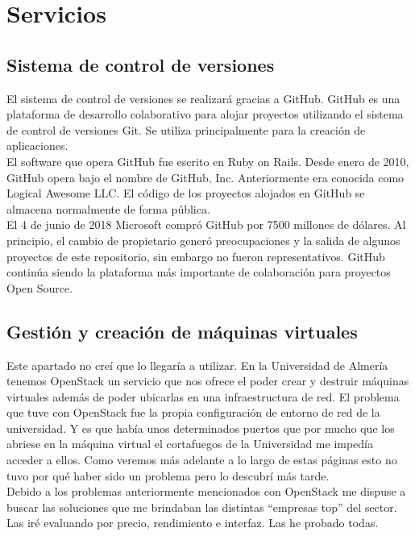 \section{Servicios}

\subsection{Sistema de control de versiones}
El sistema de control de versiones se realizará gracias a GitHub. GitHub es una plataforma de desarrollo colaborativo para alojar proyectos utilizando el sistema de control de versiones Git. Se utiliza principalmente para la creación de aplicaciones. 
\\El software que opera GitHub fue escrito en Ruby on Rails. Desde enero de 2010, GitHub opera bajo el nombre de GitHub, Inc. Anteriormente era conocida como Logical Awesome LLC. El código de los proyectos alojados en GitHub se almacena normalmente de forma pública.
\\El 4 de junio de 2018 Microsoft compró GitHub por 7500 millones de dólares. Al principio, el cambio de propietario generó preocupaciones y la salida de algunos proyectos de este repositorio, sin embargo no fueron representativos. GitHub continúa siendo la plataforma más importante de colaboración para proyectos Open Source.

\subsection{Gestión y creación de máquinas virtuales}

Este apartado no creí que lo llegaría a utilizar. En la Universidad de Almería tenemos OpenStack un servicio que nos ofrece el poder crear y destruir máquinas virtuales además de poder ubicarlas en una infraestructura de red. El problema que tuve con OpenStack fue la propia configuración de entorno de red de la universidad. Y es que había unos determinados puertos que por mucho que los abriese en la máquina virtual el cortafuegos de la Universidad me impedía acceder a ellos. Como veremos más adelante a lo largo de estas páginas esto no tuvo por qué haber sido un problema pero lo descubrí más tarde.
\\Debido a los problemas anteriormente mencionados con OpenStack me dispuse a buscar las soluciones que me brindaban las distintas ``empresas top'' del sector.
\\Las iré evaluando por precio, rendimiento e interfaz. Las he probado todas.

